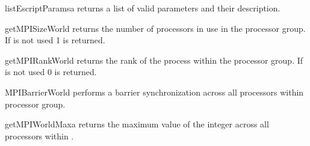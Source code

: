 \begin{funcdesc}{listEscriptParams}{a}
returns a list of valid parameters and their description.
\end{funcdesc}

\begin{funcdesc}{getMPISizeWorld}{}
returns the number of \MPI processors in use in the  processor group.
If \MPI is not used 1 is returned.
\end{funcdesc}
\begin{funcdesc}{getMPIRankWorld}{}
returns the rank of the process within the  processor group.
If \MPI is not used 0 is returned.
\end{funcdesc}
\begin{funcdesc}{MPIBarrierWorld}{}
performs a barrier synchronization across all processors within 
processor group.
\end{funcdesc}
\begin{funcdesc}{getMPIWorldMax}{a}
returns the maximum value of the integer  across all
processors within .
\end{funcdesc}

